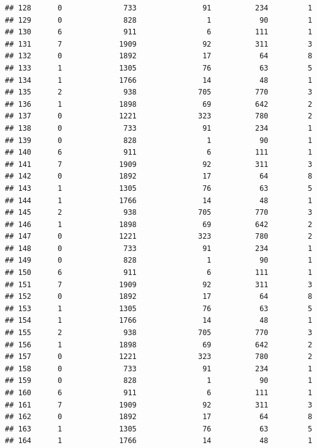 \documentclass[
]{article}
\begin{document}
\begin{verbatim}
## 128      0              733               91          234         1
## 129      0              828                1           90         1
## 130      6              911                6          111         1
## 131      7             1909               92          311         3
## 132      0             1892               17           64         8
## 133      1             1305               76           63         5
## 134      1             1766               14           48         1
## 135      2              938              705          770         3
## 136      1             1898               69          642         2
## 137      0             1221              323          780         2
## 138      0              733               91          234         1
## 139      0              828                1           90         1
## 140      6              911                6          111         1
## 141      7             1909               92          311         3
## 142      0             1892               17           64         8
## 143      1             1305               76           63         5
## 144      1             1766               14           48         1
## 145      2              938              705          770         3
## 146      1             1898               69          642         2
## 147      0             1221              323          780         2
## 148      0              733               91          234         1
## 149      0              828                1           90         1
## 150      6              911                6          111         1
## 151      7             1909               92          311         3
## 152      0             1892               17           64         8
## 153      1             1305               76           63         5
## 154      1             1766               14           48         1
## 155      2              938              705          770         3
## 156      1             1898               69          642         2
## 157      0             1221              323          780         2
## 158      0              733               91          234         1
## 159      0              828                1           90         1
## 160      6              911                6          111         1
## 161      7             1909               92          311         3
## 162      0             1892               17           64         8
## 163      1             1305               76           63         5
## 164      1             1766               14           48         1

\end{verbatim}
\end{document}
